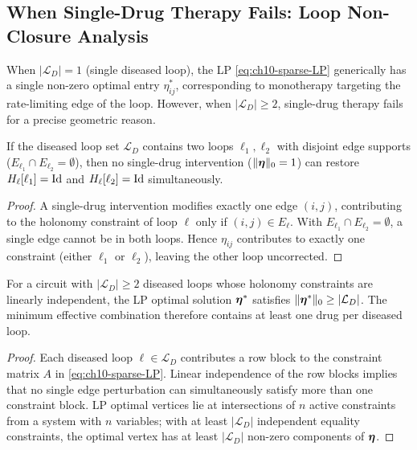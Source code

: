 \subsection{When Single-Drug Therapy Fails: Loop Non-Closure Analysis}

When $|\mathcal{L}_D| = 1$ (single diseased loop), the LP \eqref{eq:ch10-sparse-LP}
generically has a single non-zero optimal entry $\eta_{ij}^*$, corresponding
to monotherapy targeting the rate-limiting edge of the loop.  However, when
$|\mathcal{L}_D| \geq 2$, single-drug therapy fails for a precise geometric
reason.

\begin{proposition}
\label{prop:loop-nonclosure}
If the diseased loop set $\mathcal{L}_D$ contains two loops $\ell_1, \ell_2$
with disjoint edge supports ($E_{\ell_1} \cap E_{\ell_2} = \emptyset$), then
no single-drug intervention ($\|\boldsymbol{\eta}\|_0 = 1$) can restore
$H_\ell[\ell_1] = \mathrm{Id}$ and $H_\ell[\ell_2] = \mathrm{Id}$ simultaneously.
\end{proposition}

\begin{proof}
A single-drug intervention modifies exactly one edge $(i,j)$, contributing
to the holonomy constraint of loop $\ell$ only if $(i,j) \in E_\ell$.  With
$E_{\ell_1} \cap E_{\ell_2} = \emptyset$, a single edge cannot be in both
loops.  Hence $\eta_{ij}$ contributes to exactly one constraint (either
$\ell_1$ or $\ell_2$), leaving the other loop uncorrected.
\end{proof}

\begin{proposition}
\label{prop:polypharmacy}
For a circuit with $|\mathcal{L}_D| \geq 2$ diseased loops whose holonomy
constraints are linearly independent, the LP optimal solution $\boldsymbol{\eta}^*$
satisfies $\|\boldsymbol{\eta}^*\|_0 \geq |\mathcal{L}_D|$.  The minimum effective
combination therefore contains at least one drug per diseased loop.
\end{proposition}

\begin{proof}
Each diseased loop $\ell \in \mathcal{L}_D$ contributes a row block to the
constraint matrix $A$ in \eqref{eq:ch10-sparse-LP}.  Linear independence of the
row blocks implies that no single edge perturbation can simultaneously satisfy
more than one constraint block.  LP optimal vertices lie at intersections of
$n$ active constraints from a system with $n$ variables; with at least
$|\mathcal{L}_D|$ independent equality constraints, the optimal vertex has at
least $|\mathcal{L}_D|$ non-zero components of $\boldsymbol{\eta}$.
\end{proof}

